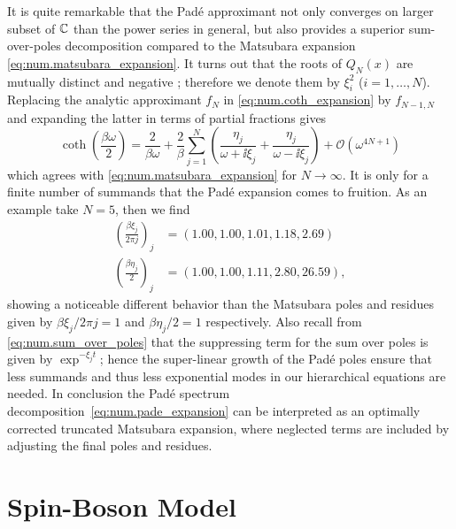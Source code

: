 It is quite remarkable that the Padé approximant not only converges on larger subset of $\mathbb{C}$ than the power series in general, but also provides a superior sum-over-poles decomposition compared to the Matsubara expansion \autoref{eq:num.matsubara_expansion}.
It turns out that the roots of $Q_N(x)$ are mutually distinct and negative \cite{HuXuYa10_pade}; therefore we denote them by $\xi_i^2$ ($i=1,\dots,N$).
Replacing the analytic approximant $f_N$ in \autoref{eq:num.coth_expansion} by $f_{N-1,N}$ and expanding the latter in terms of partial fractions gives
\begin{equation}
  \coth\left( \frac{\beta\omega}{2} \right) = \frac{2}{\beta\omega} + \frac{2}{\beta} \sum_{j=1}^N \left( \frac{\eta_j}{\omega + \ii\xi_j} + \frac{\eta_j}{\omega - \ii\xi_j} \right) + \mathcal{O}(\omega^{4N+1})
  \label{eq:num.pade_expansion}
\end{equation}
which agrees with \autoref{eq:num.matsubara_expansion} for $N\to\infty$.
It is only for a finite number of summands that the Padé expansion comes to fruition.
As an example take $N=5$, then we find
\begin{align*}
  \left( \frac{\beta \xi_j}{2\pi j} \right)_j &= (1.00, 1.00, 1.01, 1.18, 2.69) \\
  \left( \frac{\beta\eta_j}{2} \right)_j &= (1.00, 1.00, 1.11, 2.80, 26.59),
\end{align*}
showing a noticeable different behavior than the Matsubara poles and residues given by $\beta \xi_j/2\pi j = 1$ and $\beta \eta_j/2 = 1$ respectively.
Also recall from \autoref{eq:num.sum_over_poles} that the suppressing term for the sum over poles is given by $\exp^{-\xi_j t}$; hence the super-linear growth of the Padé poles ensure that less summands and thus less exponential modes in our hierarchical equations are needed.
In conclusion the Padé spectrum decomposition~\ref{eq:num.pade_expansion} can be interpreted as an optimally corrected truncated Matsubara expansion, where neglected terms are included by adjusting the final poles and residues.






\section{Spin-Boson Model}
\label{sec:num.spin_boson}
%

